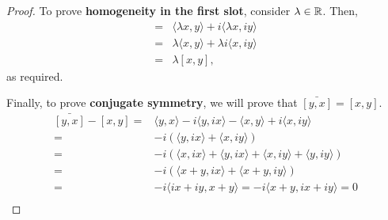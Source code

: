 \begin{proof}
    To prove \textbf{homogeneity in the first slot}, consider $\lambda\in\mathbb{R}$. Then,
    \begin{align*}
        [\lambda x,y] =& \langle\lambda x,y\rangle+i\langle\lambda x,iy\rangle\\
        =& \lambda\langle x,y\rangle+\lambda i\langle x,iy\rangle\\
        =& \lambda[x,y],
    \end{align*}
    as required.

    Finally, to prove \textbf{conjugate symmetry}, we will prove that $\bar{[y,x]}=[x,y]$.
    \begin{align*}
        \bar{[y,x]}-[x,y] =& \langle y,x\rangle -i\langle y,ix\rangle - \langle x,y\rangle + i\langle x,iy\rangle\\
        =& -i(\langle y,ix\rangle + \langle x,iy\rangle)\\
        =& -i(\langle x,ix\rangle + \langle y,ix\rangle + \langle x,iy\rangle +\langle y,iy\rangle)\\
        =& -i(\langle x+y,ix\rangle + \langle x+y,iy\rangle)\\
        =& -i\langle ix+iy, x+y\rangle= -i\langle x+y, ix+iy\rangle=0\\
    \end{align*}
\end{proof}
